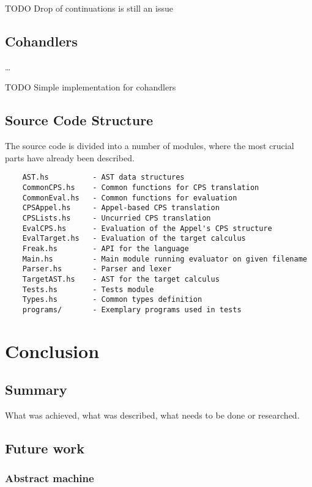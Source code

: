 \documentclass[declaration,shortabstract]{iithesis}
\theoremstyle{definition} \newtheorem{definition}{Definition}[chapter]
\theoremstyle{remark} \newtheorem{remark}[definition]{Observation}
\theoremstyle{plain} \newtheorem{theorem}[definition]{Theorem}
\theoremstyle{plain} \newtheorem{lemma}[definition]{Lemma}
\begin{document}
    TODO Drop of continuations is still an issue

    \section{Cohandlers}
    \ldots

    TODO Simple implementation for cohandlers

    \section{Source Code Structure}

    The source code is divided into a number of modules, where the most
    crucial parts have already been described.

    \begin{verbatim}
    AST.hs          - AST data structures
    CommonCPS.hs    - Common functions for CPS translation
    CommonEval.hs   - Common functions for evaluation
    CPSAppel.hs     - Appel-based CPS translation
    CPSLists.hs     - Uncurried CPS translation
    EvalCPS.hs      - Evaluation of the Appel's CPS structure
    EvalTarget.hs   - Evaluation of the target calculus
    Freak.hs        - API for the language
    Main.hs         - Main module running evaluator on given filename
    Parser.hs       - Parser and lexer
    TargetAST.hs    - AST for the target calculus
    Tests.hs        - Tests module
    Types.hs        - Common types definition
    programs/       - Exemplary programs used in tests
    \end{verbatim}

\chapter{Conclusion}
\section{Summary}

    What was achieved, what was described, what needs to be done or researched.

\section{Future work}

    \subsection{Abstract machine}
\end{document}
